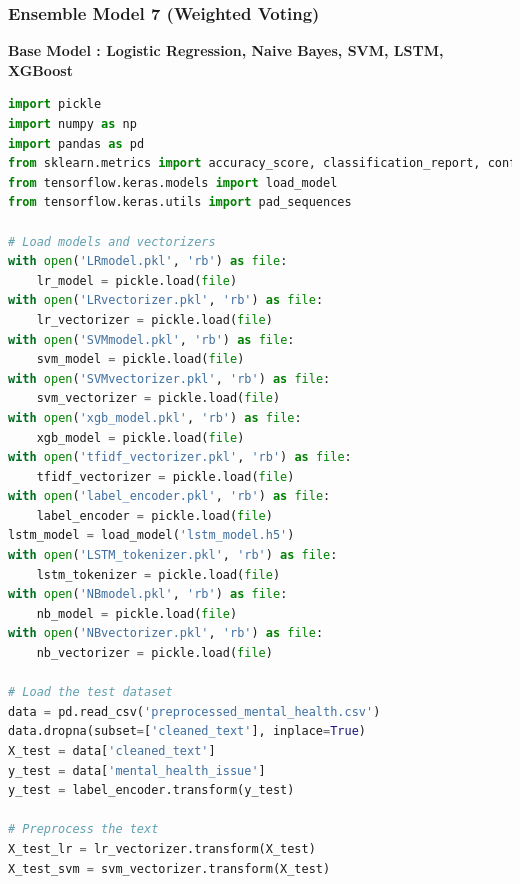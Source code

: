 \pagebreak
\subsubsection{Ensemble Model 7 (Weighted Voting)}

\textbf{Base Model : Logistic Regression, Naive Bayes, SVM, LSTM, XGBoost}

\begin{tcolorbox}[colback=gray!5!white, colframe=gray!80!black, boxrule=0.5pt, title=Weighted Voting Ensemble for Classification]
    \begin{lstlisting}[language=Python]
import pickle
import numpy as np
import pandas as pd
from sklearn.metrics import accuracy_score, classification_report, confusion_matrix
from tensorflow.keras.models import load_model
from tensorflow.keras.utils import pad_sequences

# Load models and vectorizers
with open('LRmodel.pkl', 'rb') as file:
    lr_model = pickle.load(file)
with open('LRvectorizer.pkl', 'rb') as file:
    lr_vectorizer = pickle.load(file)
with open('SVMmodel.pkl', 'rb') as file:
    svm_model = pickle.load(file)
with open('SVMvectorizer.pkl', 'rb') as file:
    svm_vectorizer = pickle.load(file)
with open('xgb_model.pkl', 'rb') as file:
    xgb_model = pickle.load(file)
with open('tfidf_vectorizer.pkl', 'rb') as file:
    tfidf_vectorizer = pickle.load(file)
with open('label_encoder.pkl', 'rb') as file:
    label_encoder = pickle.load(file)
lstm_model = load_model('lstm_model.h5')
with open('LSTM_tokenizer.pkl', 'rb') as file:
    lstm_tokenizer = pickle.load(file)
with open('NBmodel.pkl', 'rb') as file:
    nb_model = pickle.load(file)
with open('NBvectorizer.pkl', 'rb') as file:
    nb_vectorizer = pickle.load(file)

# Load the test dataset
data = pd.read_csv('preprocessed_mental_health.csv')
data.dropna(subset=['cleaned_text'], inplace=True)
X_test = data['cleaned_text']
y_test = data['mental_health_issue']
y_test = label_encoder.transform(y_test)

# Preprocess the text
X_test_lr = lr_vectorizer.transform(X_test)
X_test_svm = svm_vectorizer.transform(X_test)
\end{lstlisting}
\end{tcolorbox}

